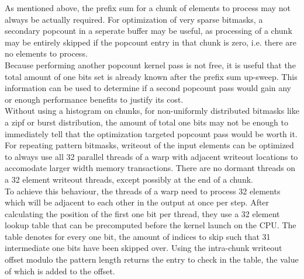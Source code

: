 \documentclass{tudscrreprt}
\begin{document}
			As mentioned above, the prefix sum for a chunk of elements to process may not always be actually required. For optimization of very sparse bitmasks, a secondary popcount in a seperate buffer may be useful, as processing of a chunk may be entirely skipped if the popcount entry in that chunk is zero, i.e. there are no elements to process. \\
			Because performing another popcount kernel pass is not free, it is useful that the total amount of one bits set is already known after the prefix sum up-sweep. This information can be used to determine if a second popcount pass would gain any or enough performance benefits to justify its cost. \\
			Without using a histogram on chunks, for non-uniformly distributed bitmasks like a zipf or burst distribution, the amount of total one bits may not be enough to immediately tell that the optimization targeted popcount pass would be worth it. \\
			
			For repeating pattern bitmasks, writeout of the input elements can be optimized to always use all 32 parallel threads of a warp with adjacent writeout locations to accomodate larger width memory transactions. There are no dormant threads on a 32 element writeout threads, except possibly at the end of a chunk. \\
			To achieve this behaviour, the threads of a warp need to process 32 elements which will be adjacent to each other in the output at once per step. After calculating the position of the first one bit per thread, they use a 32 element lookup table that can be precomputed before the kernel launch on the CPU. The table denotes for every one bit, the amount of indices to skip such that 31 intermediate one bits have been skipped over. Using the intra-chunk writeout offset modulo the pattern length returns the entry to check in the table, the value of which is added to the offset. \\
		
\end{document}
